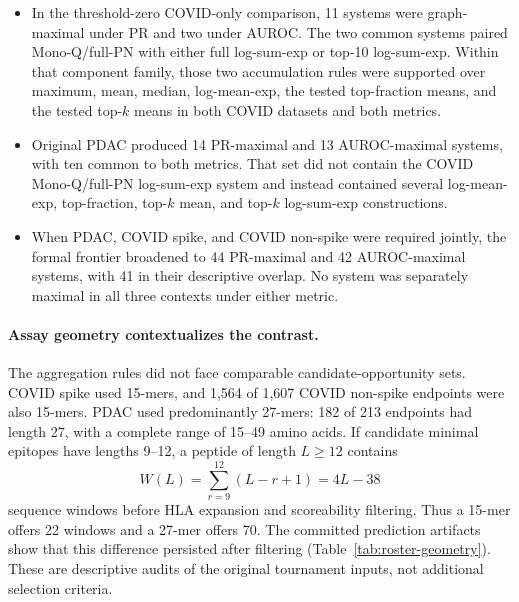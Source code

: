 \documentclass[11pt]{article}
\begin{document}
\begin{itemize}
  \item In the threshold-zero COVID-only comparison, 11 systems were
  graph-maximal under PR and two under AUROC. The two common systems paired
  Mono-Q/full-PN with either full log-sum-exp or top-10 log-sum-exp. Within
  that component family, those two accumulation rules were supported over
  maximum, mean, median, log-mean-exp, the tested top-fraction means, and the
  tested top-$k$ means in both COVID datasets and both metrics.

  \item Original PDAC produced 14 PR-maximal and 13 AUROC-maximal systems,
  with ten common to both metrics. That set did not contain the COVID
  Mono-Q/full-PN log-sum-exp system and instead contained several
  log-mean-exp, top-fraction, top-$k$ mean, and top-$k$ log-sum-exp
  constructions.

  \item When PDAC, COVID spike, and COVID non-spike were required jointly, the
  formal frontier broadened to 44 PR-maximal and 42 AUROC-maximal systems,
  with 41 in their descriptive overlap. No system was separately maximal in
  all three contexts under either metric.
\end{itemize}

\paragraph{Assay geometry contextualizes the contrast.}
The aggregation rules did not face comparable candidate-opportunity sets.
COVID spike used 15-mers, and 1,564 of 1,607 COVID non-spike endpoints were
also 15-mers. PDAC used predominantly 27-mers: 182 of 213 endpoints had length
27, with a complete range of 15--49 amino acids. If candidate minimal epitopes
have lengths 9--12, a peptide of length $L\geq12$ contains
\begin{equation}
W(L)=\sum_{r=9}^{12}(L-r+1)=4L-38
\end{equation}
sequence windows before HLA expansion and scoreability filtering. Thus a
15-mer offers 22 windows and a 27-mer offers 70. The committed prediction
artifacts show that this difference persisted after filtering
(Table~\ref{tab:roster-geometry}). These are descriptive audits of the
original tournament inputs, not additional selection criteria.
\end{document}
